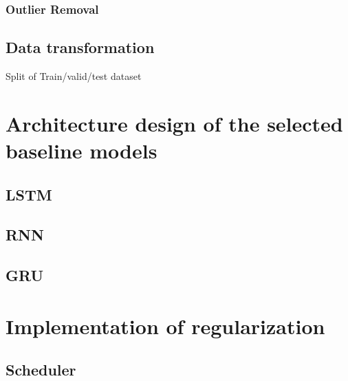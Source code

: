 \subsubsection{Outlier Removal}
\subsection{Data transformation}
Split of Train/valid/test dataset 
\section{Architecture design of the selected baseline models}
\subsection{LSTM}
\subsection{RNN}
\subsection{GRU}
\section{Implementation of regularization}
\subsection{Scheduler}
